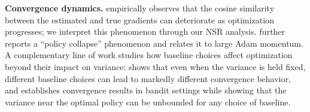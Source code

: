 \textbf{Convergence dynamics.}
\cite{ilyas18arxiv-policycollapse} empirically observes that the cosine similarity between the estimated and true gradients can deteriorate as optimization progresses; we interpret this phenomenon through our NSR analysis. \cite{dohare23ewrl-policycollapse} further reports a ``policy collapse'' phenomenon and relates it to large Adam momentum. A complementary line of work studies how baseline choices affect optimization beyond their impact on variance: \cite{chung21icml-committalbaselines} shows that even when the variance is held fixed, different baseline choices can lead to markedly different convergence behavior, and \cite{mei22neurips-committalbaselines} establishes convergence results in bandit settings while showing that the variance near the optimal policy can be unbounded for any choice of baseline.





